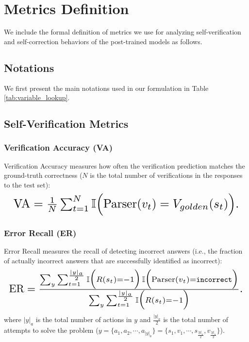 \section{Metrics Definition}
\label{ap:metric}
We include the formal definition of metrics we use for analyzing self-verification and self-correction behaviors of the post-trained models as follows.

\subsection{Notations}
We first present the main notations used in our formulation in Table \ref{tab:variable_lookup}.



\subsection{Self-Verification Metrics}

\subsubsection{Verification Accuracy (VA)}
Verification Accuracy measures how often the verification prediction matches the ground-truth correctness ($N$ is the total number of verifications in the responses to the test set):
\begin{equation}
\resizebox{\linewidth}{!}{
$\text{VA} = \frac{1}{N}\sum_{t=1}^{N} \mathbb{I}\Bigl(\text{Parser}(v_t) = V_{golden}(s_t)\Bigr).$
}
\end{equation}

\subsubsection{Error Recall (ER)}
Error Recall measures the recall of detecting incorrect answers (i.e., the fraction of actually incorrect answers that are successfully identified as incorrect):
\begin{equation}
\label{eq:error_recall}
\resizebox{\linewidth}{!}{$
\text{ER} = \frac{\sum_y\sum_{t=1}^\frac{|y|_a}{2} 
    \mathbb{I}\Bigl(R(s_{t})=-1\Bigr)\,
    \mathbb{I}\Bigl(\text{Parser}(v_t)=\texttt{incorrect}\Bigr)}
  {\sum_y\sum_{t=1}^{\frac{|y|_a}{2}}
    \mathbb{I}\Bigl(R(s_{t})=-1\Bigr)}.
$}
\end{equation}
where $|y|_a$ is the total number of actions in $y$ and $\frac{|y|_a}{2}$ is the total number of attempts to solve the problem ($y=\{a_1, a_2,\cdots,a_{|y|_a}\}=\{s_1, v_1,\cdots,s_\frac{|y|_a}{2},v_\frac{|y|_a}{2} \}$). 

